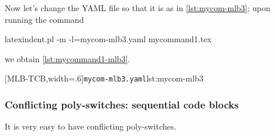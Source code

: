 \documentclass[10pt]{article}
\begin{document}
 \begin{example}
 Now let's change the YAML file so that it is as in \cref{lst:mycom-mlb3}; upon running
 the command

 \begin{commandshell}
latexindent.pl -m -l=mycom-mlb3.yaml mycommand1.tex
\end{commandshell}

 we obtain \cref{lst:mycommand1-mlb3}.

 \begin{cmhtcbraster}[
   raster force size=false,
   raster column 1/.style={add to width=-1cm},
  ]
  [MLB-TCB,width=.6\textwidth]{\texttt{mycom-mlb3.yaml}}{lst:mycom-mlb3}
 \end{cmhtcbraster}
 \end{example}

\subsubsection{Conflicting poly-switches: sequential code blocks}
 It is very easy to have conflicting poly-switches.
\end{document}
